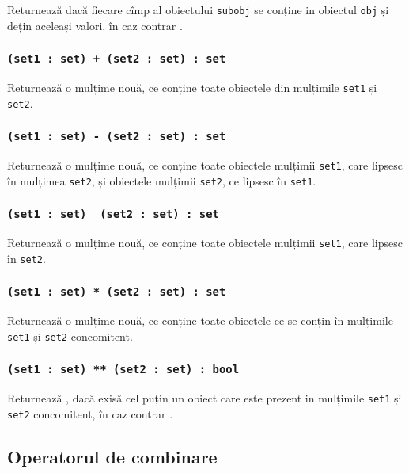 Returnează \false{} dacă fiecare cîmp al obiectului \texttt{subobj} se conține in obiectul \texttt{obj} și dețin aceleași valori, în caz contrar \true{}.

\subsubsection{\texttt{(set1 : set) + (set2 : set) : set}}

Returnează o mulțime nouă, ce conține toate obiectele din mulțimile \texttt{set1} și \texttt{set2}.

\subsubsection{\texttt{(set1 : set) - (set2 : set) : set}}

Returnează o mulțime nouă, ce conține toate obiectele mulțimii \texttt{set1}, care lipsesc în mulțimea \texttt{set2}, și obiectele mulțimii \texttt{set2}, ce lipsesc în \texttt{set1}.

\subsubsection{\texttt{(set1 : set) \ (set2 : set) : set}}

Returnează o mulțime nouă, ce conține toate obiectele mulțimii \texttt{set1}, care lipsesc în \texttt{set2}.

\subsubsection{\texttt{(set1 : set) * (set2 : set) : set}}

Returnează o mulțime nouă, ce conține toate obiectele ce se conțin în mulțimile \texttt{set1} și \texttt{set2} concomitent.

\subsubsection{\texttt{(set1 : set) ** (set2 : set) : bool}}

Returnează \true, dacă exisă cel puțin un obiect care este prezent in mulțimile \texttt{set1} și \texttt{set2} concomitent, în caz contrar \false.

\subsection{Operatorul de combinare}

